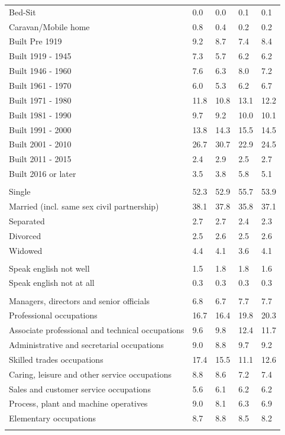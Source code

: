 \documentclass{article}
\begin{document}
\begin{table}[h]
\begin{tabular}{KTTTT}
Bed-Sit & 0.0& 0.0& 0.1& 0.1\\
Caravan/Mobile home & 0.8& 0.4& 0.2& 0.2\\
    \hline
Built Pre 1919 & 9.2& 8.7& 7.4& 8.4\\
Built 1919 - 1945 & 7.3& 5.7& 6.2& 6.2\\
Built  1946 - 1960 & 7.6& 6.3& 8.0& 7.2\\
Built  1961 - 1970 & 6.0& 5.3& 6.2& 6.7\\
Built  1971 - 1980 & 11.8& 10.8& 13.1& 12.2\\
Built  1981 - 1990 &  9.7&  9.2& 10.0& 10.1\\
Built  1991 - 2000 & 13.8& 14.3& 15.5& 14.5\\
Built  2001 - 2010 & 26.7& 30.7& 22.9& 24.5\\
Built  2011 - 2015 & 2.4& 2.9& 2.5& 2.7\\
Built  2016 or later & 3.5& 3.8& 5.8& 5.1\\
\hline
    \\
    \hline
Single & 52.3& 52.9& 55.7& 53.9\\
Married (incl. same sex civil partnership) & 38.1& 37.8& 35.8& 37.1\\
Separated  & 2.7& 2.7& 2.4& 2.3\\
Divorced  & 2.5& 2.6& 2.5& 2.6\\
Widowed & 4.4& 4.1& 3.6& 4.1\\
\hline
    \\ 
    \hline
Speak english not well & 1.5& 1.8& 1.8& 1.6\\
Speak english not at all & 0.3& 0.3& 0.3& 0.3\\
\hline
    \\
    \hline
Managers, directors and senior officials & 6.8& 6.7& 7.7& 7.7\\
Professional occupations & 16.7& 16.4& 19.8& 20.3\\
Associate professional and technical occupations &  9.6&  9.8& 12.4& 11.7\\
Administrative and secretarial occupations & 9.0& 8.8& 9.7& 9.2\\
Skilled trades occupations & 17.4& 15.5& 11.1& 12.6\\
Caring, leisure and other service occupations & 8.8& 8.6& 7.2& 7.4\\
Sales and customer service occupations & 5.6& 6.1& 6.2& 6.2\\
Process, plant and machine operatives & 9.0& 8.1& 6.3& 6.9\\
Elementary occupations & 8.7& 8.8& 8.5& 8.2\\
\hline
\end{tabular}
\end{table}
\end{document}
